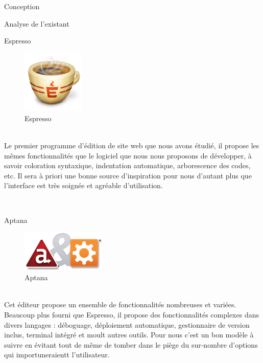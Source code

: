\documentclass[a4paper, 12pt]{report}
\begin{document}
	\begin{part}{Conception}
		\begin{chapter}{Analyse de l'existant}
			\begin{section}{Espresso}
				\begin{figure}[h]
					\begin{center}
						\includegraphics[width=3cm]{images/logoEspresso.png}
						\caption{Espresso}
					\end{center}
				\end{figure}~\\
				Le premier programme d'édition de site web que nous avons étudié, il propose les mêmes fonctionnalités que le
				logiciel que nous nous proposons de développer, à savoir coloration syntaxique, indentation automatique, arborescence des codes, etc.
				Il sera à priori une bonne source d'inspiration pour nous d'autant plus que l'interface est très soignée et agréable d'utilisation.
			\end{section}
			~\\
			\begin{section}{Aptana}
				\begin{figure}[h]
					\begin{center}
						\includegraphics[width=4cm]{images/logoAptana.png}
						\caption{Aptana}
					\end{center}
				\end{figure}~\\
				Cet éditeur propose un ensemble de fonctionnalités nombreuses et variées. Beaucoup plus fourni que Espresso, il propose des fonctionnalités complexes dans divers langages : déboguage, déploiement automatique, gestionnaire de version inclus, terminal intégré et moult autres outils.
				Pour nous c'est un bon modèle à suivre en évitant tout de même de tomber dans le piège du sur-nombre d'options qui importuneraientt l'utilisateur. 
			\end{section}
			~\\

\end{chapter}
\end{part}
\end{document}

